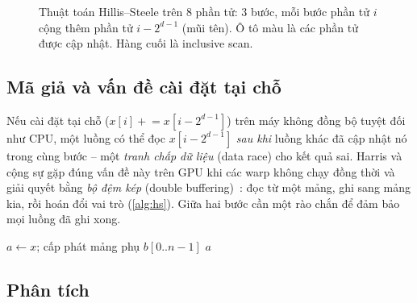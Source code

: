 \begin{figure}[H]
\centering
{}
\caption{Thuật toán Hillis--Steele trên 8 phần tử: 3 bước, mỗi bước phần tử \(i\) cộng thêm
phần tử \(i - 2^{d-1}\) (mũi tên). Ô tô màu là các phần tử được cập nhật. Hàng cuối là inclusive
scan.}
\label{fig:hs}
\end{figure}

\subsection{Mã giả và vấn đề cài đặt tại chỗ}

Nếu cài đặt tại chỗ (\(x[i] \mathrel{+}= x[i - 2^{d-1}]\)) trên máy không đồng bộ tuyệt đối như
CPU, một luồng có thể đọc \(x[i - 2^{d-1}]\) \emph{sau khi} luồng khác đã cập nhật nó trong cùng
bước -- một \emph{tranh chấp dữ liệu} (data race) cho kết quả sai. Harris và cộng sự gặp đúng vấn
đề này trên GPU khi các warp không chạy đồng thời và giải quyết bằng \emph{bộ đệm kép}
(double buffering)~\cite{harris2007}: đọc từ một mảng, ghi sang mảng kia, rồi hoán đổi vai trò
(\cref{alg:hs}). Giữa hai bước cần một rào chắn để đảm bảo mọi luồng đã ghi xong.

\begin{algorithm}[H]
\caption{Hillis--Steele với bộ đệm kép}
\label{alg:hs}
\(a \gets x\); cấp phát mảng phụ \(b[0..n-1]\)\;
\Return \(a\)\;
\end{algorithm}

\subsection{Phân tích}

